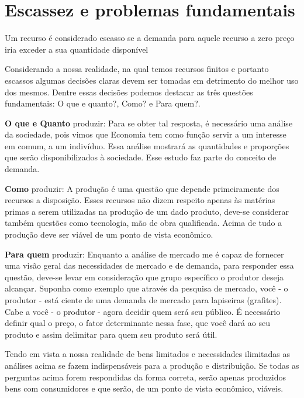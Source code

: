 \section{Escassez e problemas fundamentais}
Um recurso é considerado escasso se a demanda para aquele recurso a zero preço iria exceder a sua quantidade disponível\citep{bvfd}\par
Considerando a nossa realidade, na qual temos recursos finitos e portanto escassos algumas decisões claras devem ser tomadas em detrimento do melhor uso dos mesmos. Dentre essas decisões podemos destacar as três questões fundamentais:  O que e quanto?, Como? e Para quem?.\par
\textbf{O que e Quanto} produzir: Para se obter tal resposta, é necessário uma análise da sociedade, pois vimos que Economia tem como função servir a um interesse em comum, a um indivíduo. Essa análise mostrará as quantidades e proporções que serão disponibilizados à sociedade. Esse estudo faz parte do conceito de demanda.\par
\textbf{Como} produzir: A produção é uma questão que depende primeiramente dos recursos a disposição. Esses recursos não dizem respeito apenas às matérias primas a serem utilizadas na produção de um dado produto, deve-se considerar também questões como tecnologia, mão de obra qualificada. Acima de tudo a produção deve ser viável de um ponto de vista econômico.\par
\textbf{Para quem} produzir: Enquanto a análise de mercado me é capaz de fornecer uma visão geral das necessidades de mercado e de demanda, para responder essa questão, deve-se levar em consideração que grupo específico o produtor deseja alcançar. Suponha como exemplo que através da pesquisa de mercado, você - o produtor - está ciente de uma demanda de mercado para lapiseiras (grafites). Cabe a você - o produtor - agora decidir quem será seu público. É necessário definir qual o preço, o fator determinante nessa fase, que você dará ao seu produto e assim delimitar para quem seu produto será útil.\par
Tendo em vista a nossa realidade de bens limitados e necessidades ilimitadas as análises acima se fazem indispensáveis para a produção e distribuição. Se todas as perguntas acima forem respondidas da forma correta, serão apenas produzidos bens com consumidores e que serão, de um ponto de vista econômico, viáveis.
\clearpage